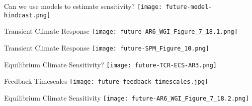 

\begin{frame}{Can we use models to estimate sensitivity?}
    \centering
    \texttt{[image: future-model-hindcast.png]}


\end{frame}

\begin{frame}{Transient Climate Response}
    \centering
    \texttt{[image: future-AR6\_WGI\_Figure\_7\_18.1.png]}
\end{frame}

\begin{frame}{Transient Climate Response}
    \centering
    \texttt{[image: future-SPM\_Figure\_10.png]}
\end{frame}

\begin{frame}{Equilibrium Climate Sensitivity?}
    \centering
    \texttt{[image: future-TCR-ECS-AR3.png]}
\end{frame}

\begin{frame}{Feedback Timescales}
    \centering
    \texttt{[image: future-feedback-timescales.jpg]}
\end{frame}

\begin{frame}{Equilibrium Climate Sensitivity}
    \centering
    \texttt{[image: future-AR6\_WGI\_Figure\_7\_18.2.png]}
\end{frame}


